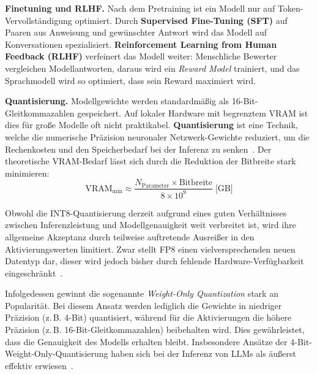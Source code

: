 \textbf{Finetuning und RLHF.}
Nach dem Pretraining ist ein Modell nur auf Token-Vervollständigung
optimiert. Durch \textbf{Supervised Fine-Tuning (SFT)} auf Paaren aus
Anweisung und gewünschter Antwort wird das Modell auf Konversationen
spezialisiert.
\textbf{Reinforcement Learning from Human Feedback (RLHF)} verfeinert
das Modell weiter: Menschliche Bewerter vergleichen Modellantworten,
daraus wird ein \emph{Reward Model} trainiert, und das Sprachmodell
wird so optimiert, dass sein Reward maximiert wird.

\textbf{Quantisierung.}\label{sec:quantisierung}
Modellgewichte werden standardmäßig als 16-Bit-Gleitkommazahlen
gespeichert. Auf lokaler Hardware mit begrenztem VRAM ist dies für
große Modelle oft nicht praktikabel. \textbf{Quantisierung} ist eine Technik, welche die numerische Präzision neuronaler Netzwerk-Gewichte reduziert, um die Rechenkosten und den Speicherbedarf bei der Inferenz zu senken~\cite{chen2025inferenceperformanceevaluationllms}.
Der theoretische VRAM-Bedarf lässt sich durch die Reduktion der Bitbreite stark minimieren:
\begin{equation}
    \text{VRAM}_{\text{min}} \approx
    \frac{N_{\text{Parameter}} \times \text{Bitbreite}}{8 \times 10^9}
    \;\text{[GB]}
    \label{eq:vram}
\end{equation}

Obwohl die INT8-Quantisierung derzeit aufgrund eines guten Verhältnisses zwischen Inferenzleistung und Modellgenauigkeit weit verbreitet ist, wird ihre allgemeine Akzeptanz durch teilweise auftretende Ausreißer in den Aktivierungswerten limitiert. Zwar stellt FP8 einen vielversprechenden neuen Datentyp dar, dieser wird jedoch bisher durch fehlende Hardware-Verfügbarkeit eingeschränkt~\cite{chen2025inferenceperformanceevaluationllms}.

Infolgedessen gewinnt die sogenannte \textit{Weight-Only Quantization} stark an Popularität. Bei diesem Ansatz werden lediglich die Gewichte in niedriger Präzision (z.\,B. 4-Bit) quantisiert, während für die Aktivierungen die höhere Präzision (z.\,B. 16-Bit-Gleitkommazahlen) beibehalten wird. Dies gewährleistet, dass die Genauigkeit des Modells erhalten bleibt. Insbesondere Ansätze der 4-Bit-Weight-Only-Quantisierung haben sich bei der Inferenz von LLMs als äußerst effektiv erwiesen~\cite{chen2025inferenceperformanceevaluationllms}.


